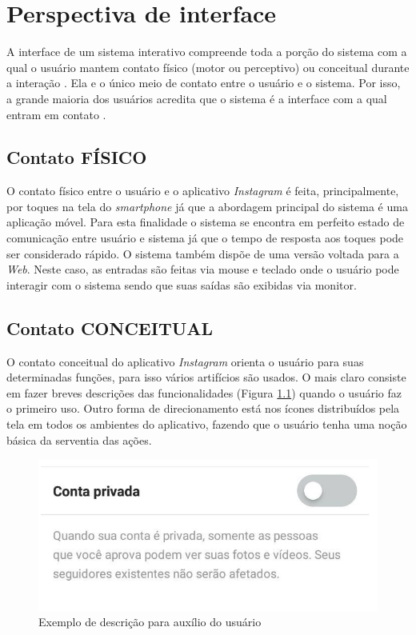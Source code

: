 \documentclass[
	12pt,				%
	openright,			%
	oneside,			%
	a4paper,			%
	english,			%
	french,				%
	spanish,			%
	brazil,				%
	]{abntex2}
\begin{document}
\chapter{Perspectiva de interface}

A interface de um sistema interativo compreende toda a porção do sistema com a qual o usuário mantem contato físico (motor ou perceptivo) ou conceitual durante a interação \cite{moran}. Ela e o único meio de contato entre o usuário e o sistema. Por isso, a grande maioria dos usuários acredita que o sistema é a interface com a qual entram em contato \cite{hix}.

\section{Contato FÍSICO}

O contato físico entre o usuário e o aplicativo \textit{Instagram} é feita, principalmente, por toques na tela do \textit{smartphone} já que a abordagem principal do sistema é uma aplicação móvel. Para esta finalidade o sistema se encontra em perfeito estado de comunicação entre usuário e sistema já que o tempo de resposta aos toques pode ser considerado rápido. O sistema também dispõe de uma versão voltada para a \textit{Web}. Neste caso, as entradas são feitas via mouse e teclado onde o usuário pode interagir com o sistema sendo que suas saídas são exibidas via monitor.

\section{Contato CONCEITUAL}

O contato conceitual do aplicativo \textit{Instagram} orienta o usuário para suas determinadas funções, para isso vários artifícios são usados. O mais claro consiste em fazer breves descrições das funcionalidades (Figura \ref{instaprivate}) quando o usuário faz o primeiro uso. Outro forma de direcionamento está nos ícones distribuídos pela tela em todos os ambientes do aplicativo, fazendo que o usuário tenha uma noção básica da serventia das ações.

\begin{figure}[htb]
	\caption{\label{instaprivate}Exemplo de descrição para auxílio do usuário}
	\begin{center}
		\includegraphics[scale=0.4]{instaprivate.jpg}
	\end{center}
\end{figure}
\end{document}
